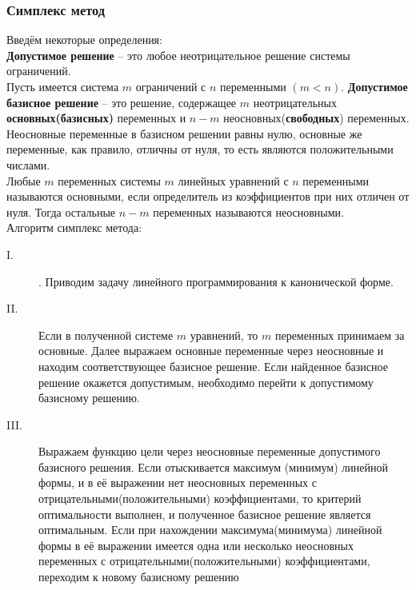 \documentclass[a4paper,14pt]{article}
\theoremstyle{plain}
\theoremstyle{definition}
\theoremstyle{remark}
\newcommand{\nl}{\\ \indent}
\begin{document}
\subsubsection{Симплекс метод}
Введём некоторые определения:
\nl
\textbf{Допустимое решение} -- это любое неотрицательное 
решение системы ограничений. 
\nl
Пусть имеется система $m$ ограничений с $n$ переменными 
$(m < n)$.
\textbf{Допустимое базисное решение} --  это решение, 
содержащее $m$ неотрицательных \textbf{основных(базисных)}
переменных и $n - m$ неосновных(\textbf{свободных}) переменных.
\nl 
Неосновные переменные в базисном решении равны нулю, 
основные же переменные, как правило, отличны от нуля, 
то есть являются положительными числами.
\nl
Любые $m$ переменных системы $m$ линейных уравнений с 
$n$ переменными называются основными, если определитель 
из коэффициентов при них отличен от нуля. 
Тогда остальные $n - m$ переменных называются неосновными.
\nl
Алгоритм симплекс метода:
\begin{description}
\item[I.] . Приводим задачу линейного программирования к
канонической форме.
\item[II.] Если в полученной системе $m$ уравнений, 
то $m$ переменных принимаем за основные. 
Далее выражаем основные переменные через неосновные и 
находим соответствующее базисное решение. 
Если найденное базисное решение окажется допустимым, 
необходимо перейти к допустимому базисному решению.
\item[III.] Выражаем функцию цели через неосновные переменные
допустимого базисного решения. 
Если отыскивается максимум (минимум) линейной формы, 
и в её выражении нет неосновных переменных с
отрицательными(положительными) коэффициентами,
то критерий оптимальности выполнен, 
и полученное базисное 
решение является оптимальным. 
Если при нахождении максимума(минимума) линейной формы в её
выражении имеется одна или несколько неосновных переменных с
отрицательными(положительными) коэффициентами, переходим к 
новому базисному решению
\end{description}
\end{document}
